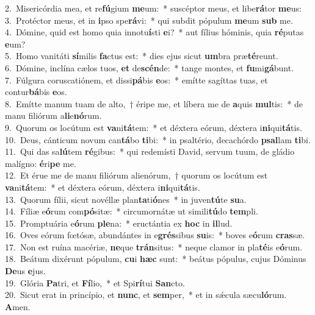 {2.~}Misericórdia mea, et re\textbf{fú}gium \textbf{me}um:~* suscéptor meus, et libe\textbf{rá}tor \textbf{me}us:\\
{3.~}Protéctor meus, et in \textbf{i}pso spe\textbf{rá}vi:~* qui subdit pópulum \textbf{me}um \textbf{sub} me.\\
{4.~}Dómine, quid est homo quia innotu\textbf{í}sti \textbf{e}i?~* aut fílius hóminis, quia \textbf{ré}putas \textbf{e}um?\\
{5.~}Homo vanitáti \textbf{sí}milis \textbf{fa}ctus est:~* dies ejus sicut \textbf{um}bra præ\textbf{té}reunt.\\
{6.~}Dómine, inclína cælos tuos, \textbf{et} de\textbf{scén}de:~* tange montes, et \textbf{fu}mi\textbf{gá}bunt.\\
{7.~}Fúlgura coruscatiónem, et dissi\textbf{pá}bis \textbf{e}os:~* emítte sagíttas tuas, et contur\textbf{bá}bis \textbf{e}os.\\
{8.~}Emítte manum tuam de alto,~† éripe me, et líbera me de \textbf{a}quis \textbf{mul}tis:~* de manu filiórum a\textbf{li}e\textbf{nó}rum.\\
{9.~}Quorum os locútum est \textbf{va}ni\textbf{tá}tem:~* et déxtera eórum, déxtera i\textbf{ni}qui\textbf{tá}tis.\\
{10.~}Deus, cánticum novum can\textbf{tá}bo \textbf{ti}bi:~* in psaltério, decachórdo \textbf{psal}lam \textbf{ti}bi.\\
{11.~}Qui das sa\textbf{lú}tem \textbf{ré}gibus:~* qui redemísti David, servum tuum, de gládio malígno: \textbf{é}ri\textbf{pe} me.\\
{12.~}Et érue me de manu filiórum alienórum,~† quorum os locútum est \textbf{va}ni\textbf{tá}tem:~* et déxtera eórum, déxtera i\textbf{ni}qui\textbf{tá}tis.\\
{13.~}Quorum fílii, sicut novéllæ plan\textbf{ta}ti\textbf{ó}nes~* in juven\textbf{tú}te \textbf{su}a.\\
{14.~}Fíliæ e\textbf{ó}rum com\textbf{pó}sitæ:~* circumornátæ ut simili\textbf{tú}do \textbf{tem}pli.\\
{15.~}Promptuária e\textbf{ó}rum \textbf{ple}na:~* eructántia ex \textbf{hoc} in \textbf{il}lud.\\
{16.~}Oves eórum fœtósæ, abundántes in e\textbf{grés}sibus \textbf{su}is:~* boves e\textbf{ó}rum \textbf{cras}sæ.\\
{17.~}Non est ruína macériæ, \textbf{ne}que \textbf{trán}situs:~* neque clamor in pla\textbf{té}is e\textbf{ó}rum.\\
{18.~}Beátum dixérunt pópulum, \textbf{cu}i \textbf{hæc} sunt:~* beátus pópulus, cujus Dóminus \textbf{De}us \textbf{e}jus.\\
{19.~}Glória \textbf{Pa}tri, et \textbf{Fí}lio,~* et Spi\textbf{rí}tui \textbf{San}cto.\\
{20.~}Sicut erat in princípio, et \textbf{nunc}, et \textbf{sem}per,~* et in sǽcula sæcu\textbf{ló}rum. \textbf{A}men.\\
